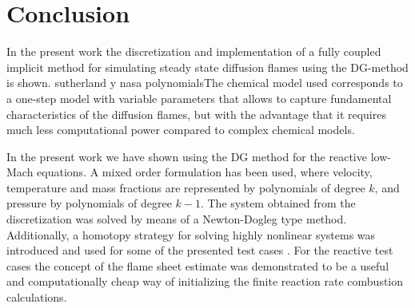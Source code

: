 \chapter{Conclusion}	\label{ch:conclusion}
\glsresetall

In the present work the discretization and implementation of a fully coupled implicit method for simulating steady state diffusion flames using the DG-method is shown. sutherland y nasa polynomialsThe chemical model used corresponds to a one-step model with variable parameters that allows to capture fundamental characteristics of the diffusion flames, but with the advantage that it requires much less computational power compared to complex chemical models.


In the present work we have shown using the DG method for the reactive low-Mach equations. A mixed order formulation has been used, where velocity, temperature and mass fractions are represented by polynomials of degree $k$, and pressure by polynomials of degree $k-1$. The system obtained from the discretization was solved by means of a Newton-Dogleg type method. Additionally, a homotopy strategy for solving highly nonlinear systems was introduced and used for some of the presented test cases . For the reactive test cases the concept of the flame sheet estimate was demonstrated to be a useful and computationally cheap way of initializing the finite reaction rate combustion calculations.
